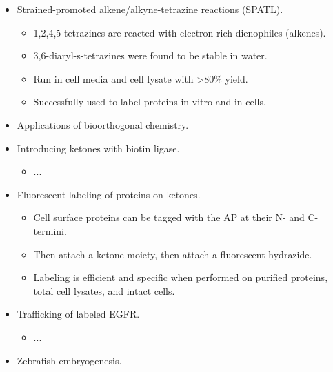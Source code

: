 \documentclass[../notes.tex]{subfiles}
\begin{document}
\begin{itemize}
\begin{itemize}
        \item Strain-promoted alkyne-nitrone cycloadditions (SPANC).
        \item Uses more reactive 1,3-dipole nitrous in place of azides.
        \item Rate constants up to \SI{60}{\per\molar\per\second} (60-fold faster than SPAAC).
        \item Faster rates means lower reagent concentrations can be used.
        \item Cyclic nitrones are more stable than acyclic counterparts.
    \end{itemize}
    \item Strained-promoted alkene/alkyne-tetrazine reactions (SPATL).
    \begin{itemize}
        \item 1,2,4,5-tetrazines are reacted with electron rich dienophiles (alkenes).
        \item 3,6-diaryl-s-tetrazines were found to be stable in water.
        \item Run in cell media and cell lysate with >80\% yield.
        \item Successfully used to label proteins in vitro and in cells.
    \end{itemize}
    \item Applications of bioorthogonal chemistry.
    \item Introducing ketones with biotin ligase.
    \begin{itemize}
        \item ...
    \end{itemize}
    \item Fluorescent labeling of proteins on ketones.
    \begin{itemize}
        \item Cell surface proteins can be tagged with the AP at their N- and C-termini.
        \item Then attach a ketone moiety, then attach a fluorescent hydrazide.
        \item Labeling is efficient and specific when performed on purified proteins, total cell lysates, and intact cells.
    \end{itemize}
    \item Trafficking of labeled EGFR.
    \begin{itemize}
        \item ...
    \end{itemize}
    \item Zebrafish embryogenesis.

\end{itemize}
\end{document}
